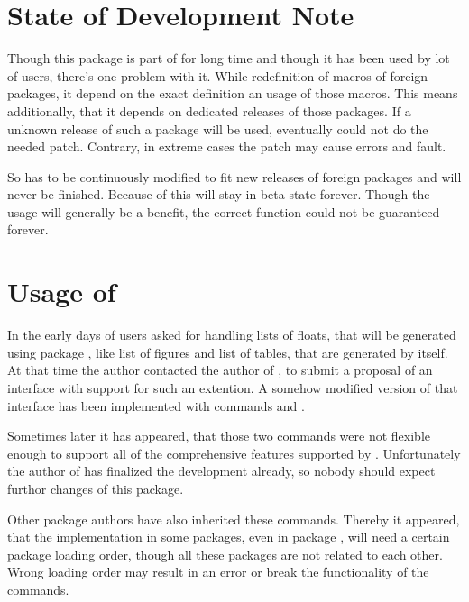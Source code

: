 \section{State of Development Note}
\label{scr:scrhack.draft}

Though this package is part of \KOMAScript{} for long time and though it has
been used by lot of users, there's one problem with it. While redefinition of
macros of foreign packages, it depend on the exact definition an usage of
those macros. This means additionally, that it depends on dedicated releases
of those packages. If a unknown release of such a package will be used,
 eventually could not do the needed patch. Contrary, in
extreme cases the patch may cause errors and fault.

So  has to be continuously modified to fit new releases of
foreign packages and will never be finished. Because of this 
will stay in beta state forever. Though the usage will generally be a
benefit, the correct function could not be guaranteed forever.


\section{Usage of }
\label{sec:scrhack.improvement}

In the early days of \KOMAScript{} users asked for handling lists of floats,
that will be generated using package
, like list of
figures and list of tables, that are generated by \KOMAScript{} itself. At
that time the \KOMAScript{} author contacted the author of , to
submit a proposal of an interface with support for such an extention. A
somehow modified version of that interface has been implemented with commands
 and
.

Sometimes later it has appeared, that those two commands were not flexible
enough to support all of the comprehensive features supported by
\KOMAScript. Unfortunately the author of  has finalized the
development already, so nobody should expect furthor changes of this package.

Other package authors have also inherited these commands. Thereby it appeared,
that the implementation in some packages, even in package ,
will need a certain package loading order, though all these packages are not
related to each other. Wrong loading order may result in an error or break the
functionality of the commands.


